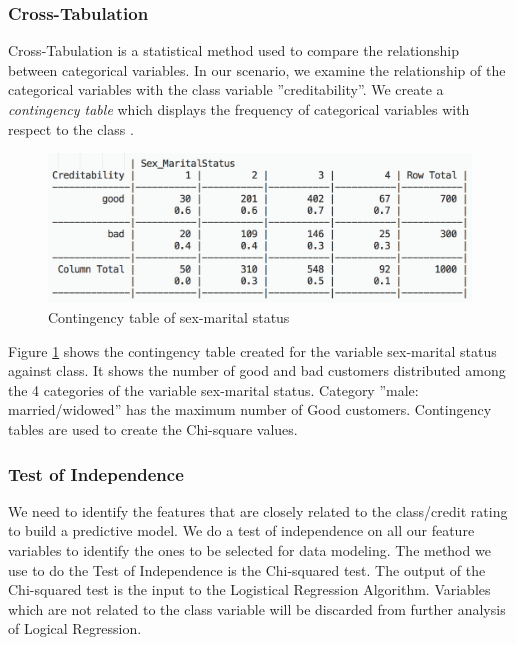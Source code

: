 \documentclass[sigconf]{acmart}
\begin{document}
\subsubsection{Cross-Tabulation}

Cross-Tabulation is a statistical method used to compare the relationship between categorical variables. In our scenario, we examine the relationship of the categorical variables with the class variable ''creditability''. We create a \emph{contingency table} which displays the frequency of categorical variables with respect to the class \cite{cross-tabulation}. 

\begin{figure}[htb]
  \centering
  \includegraphics[width=1.0\columnwidth]{images/Figure22.png}
  \caption{Contingency table of sex-marital status
   \cite{psu-site}}
  \label{fig:Figure22} 
\end{figure}


Figure \ref{fig:Figure22} shows the contingency table created for the variable sex-marital status against class. It shows the number of good and bad customers distributed among the 4 categories of the variable sex-marital status. Category ''male: married/widowed'' has the maximum number of Good customers. Contingency tables are used to create the Chi-square values.

\subsubsection{Test of Independence}

We need to identify the features that are closely related to the class/credit rating to build a predictive model. We do a test of independence on all our feature variables to identify the ones to be selected for data modeling. The method we use to do the Test of Independence is the Chi-squared test. The output of the Chi-squared test is the input to the Logistical Regression Algorithm. Variables which are not related to the class variable will be discarded from further analysis of Logical Regression. 
\end{document}
